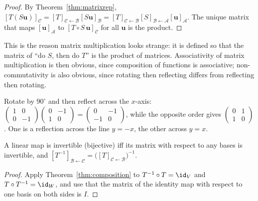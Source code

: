 \begin{proof}
By Theorem~\ref{thm:matrixrep}, $[T(S\mathbf{u})]_{\mathcal{C}}=[T]_{\mathcal{C}\leftarrow\mathcal{B}}[S\mathbf{u}]_{\mathcal{B}}=[T]_{\mathcal{C}\leftarrow\mathcal{B}}[S]_{\mathcal{B}\leftarrow\mathcal{A}}[\mathbf{u}]_{\mathcal{A}}$. The unique matrix that maps $[\mathbf{u}]_{\mathcal{A}}$ to $[T\circ S\,\mathbf{u}]_{\mathcal{C}}$ for all $\mathbf{u}$ is the product.
\end{proof}

\begin{intuition}
This is the reason matrix multiplication looks strange: it is defined so that the matrix of ``do $S$, then do $T$'' is the product of matrices. Associativity of matrix multiplication is then obvious, since composition of functions is associative; non-commutativity is also obvious, since rotating then reflecting differs from reflecting then rotating.
\end{intuition}

\begin{example}
Rotate by $90^\circ$ and then reflect across the $x$-axis: $\begin{pmatrix}1&0\\0&-1\end{pmatrix}\begin{pmatrix}0&-1\\1&0\end{pmatrix}=\begin{pmatrix}0&-1\\-1&0\end{pmatrix}$, while the opposite order gives $\begin{pmatrix}0&1\\1&0\end{pmatrix}$. One is a reflection across the line $y=-x$, the other across $y=x$.
\end{example}

\begin{theorem}\label{thm:invmap}
A linear map is invertible (bijective) iff its matrix with respect to any bases is invertible, and $[T^{-1}]_{\mathcal{B}\leftarrow\mathcal{C}}=\big([T]_{\mathcal{C}\leftarrow\mathcal{B}}\big)^{-1}$.
\end{theorem}

\begin{proof}
Apply Theorem~\ref{thm:composition} to $T^{-1}\circ T=\id_V$ and $T\circ T^{-1}=\id_W$, and use that the matrix of the identity map with respect to one basis on both sides is $I$.
\end{proof}

